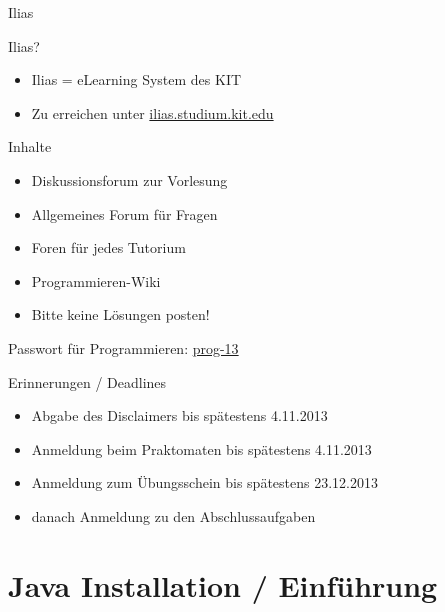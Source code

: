 \documentclass[18pt]{beamer}
\begin{document}
\begin{frame}{Ilias}
	\begin{block}{Ilias?}
	\begin{itemize}
		\item Ilias = eLearning System des KIT
		\item Zu erreichen unter \url{ilias.studium.kit.edu}
	\end{itemize}
	\end{block}
	\pause
	\begin{block}{Inhalte}
	\begin{itemize}
		\item Diskussionsforum zur Vorlesung
		\item Allgemeines Forum für Fragen
		\item Foren für jedes Tutorium
		\item Programmieren-Wiki
		\item \textcolor[rgb]{1,0,0}{Bitte keine Lösungen posten!}
	\end{itemize}
	\end{block}
	Passwort für Programmieren: \hspace{1cm} \url{prog-13}
\end{frame}

\begin{frame}{Erinnerungen / Deadlines}
	\begin{itemize}
		\item Abgabe des Disclaimers bis spätestens 4.11.2013
		\item Anmeldung beim Praktomaten bis spätestens 4.11.2013
		\item Anmeldung zum Übungsschein bis spätestens 23.12.2013	
		\item danach Anmeldung zu den Abschlussaufgaben
	\end{itemize}		
\end{frame}

\section{Java Installation / Einführung}
\begin{frame}
\end{frame}

\appendix
\beginbackup


\backupend
\end{document}
